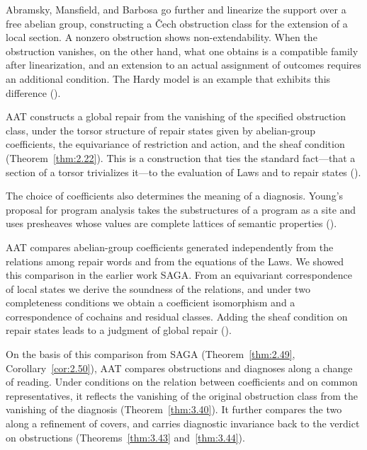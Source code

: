 Abramsky, Mansfield, and Barbosa go further and linearize the support over a free abelian
group, constructing a \v{C}ech obstruction class for the extension of a local section.
A nonzero obstruction shows non-extendability. When the obstruction vanishes, on the other
hand, what one obtains is a compatible family after linearization, and an extension to an
actual assignment of outcomes requires an additional condition.
The Hardy model is an example that exhibits this difference
(\cite[\href{https://arxiv.org/pdf/1111.3620v2}{\S4, Propositions 4.2--4.3, \S5}]{AMB12}).

AAT constructs a global repair from the vanishing of the specified obstruction class, under
the torsor structure of repair states given by abelian-group coefficients, the equivariance
of restriction and action, and the sheaf condition (Theorem~\ref{thm:2.22}).
This is a construction that ties the standard fact---that a section of a torsor
trivializes it---to the evaluation of Laws and to repair states
(\cite[\href{https://stacks.math.columbia.edu/tag/03AG}{Tag 03AG}]{Stacks}).

The choice of coefficients also determines the meaning of a diagnosis.
Young's proposal for program analysis takes the substructures of a program as a site and
uses presheaves whose values are complete lattices of semantic properties
(\cite[\href{https://arxiv.org/html/2603.27015v1}{\S\S3.1--3.4}]{Young26}).

AAT compares abelian-group coefficients generated independently from the relations among
repair words and from the equations of the Laws.
We showed this comparison in the earlier work SAGA.
From an equivariant correspondence of local states we derive the soundness of the relations,
and under two completeness conditions we obtain a coefficient isomorphism and a
correspondence of cochains and residual classes. Adding the sheaf condition on repair states
leads to a judgment of global repair
(\cite[\href{https://arxiv.org/html/2608.21458v1}{\S\S3.4--3.7, 4--5, Theorems 5.1--5.2}]{SAGA}).

On the basis of this comparison from SAGA (Theorem~\ref{thm:2.49},
Corollary~\ref{cor:2.50}), AAT compares obstructions and diagnoses along a change of
reading. Under conditions on the relation between coefficients and on common
representatives, it reflects the vanishing of the original obstruction class from the
vanishing of the diagnosis (Theorem~\ref{thm:3.40}).
It further compares the two along a refinement of covers, and carries diagnostic invariance
back to the verdict on obstructions
(Theorems~\ref{thm:3.43} and~\ref{thm:3.44}).

